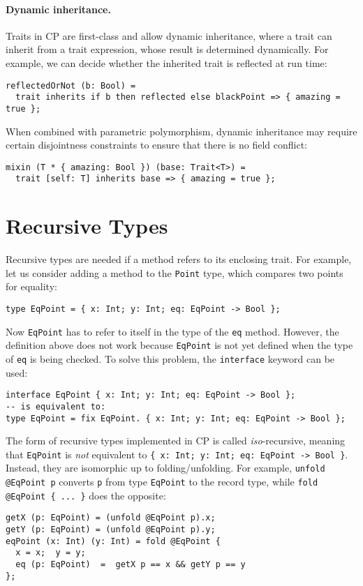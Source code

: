 \paragraph{Dynamic inheritance.}
Traits in CP are first-class and allow dynamic inheritance, where
a trait can inherit from a trait expression, whose result is determined
dynamically. For example, we can decide whether the inherited trait is reflected
at run time:
\begin{lstlisting}
reflectedOrNot (b: Bool) =
  trait inherits if b then reflected else blackPoint => { amazing = true };
\end{lstlisting}
When combined with parametric polymorphism, dynamic inheritance may require
certain disjointness constraints to ensure that there is no field conflict:
\begin{lstlisting}
mixin (T * { amazing: Bool }) (base: Trait<T>) =
  trait [self: T] inherits base => { amazing = true };
\end{lstlisting}

\section{Recursive Types}

Recursive types are needed if a method refers to its enclosing trait. For
example, let us consider adding a method to the \lstinline{Point} type, which
compares two points for equality:
\begin{lstlisting}
type EqPoint = { x: Int; y: Int; eq: EqPoint -> Bool };
\end{lstlisting}
Now \lstinline{EqPoint} has to refer to itself in the type of the \lstinline{eq}
method. However, the definition above does not work because \lstinline{EqPoint} is
not yet defined when the type of \lstinline{eq} is being checked. To solve this
problem, the \lstinline{interface} keyword can be used:
\begin{lstlisting}
interface EqPoint { x: Int; y: Int; eq: EqPoint -> Bool };
-- is equivalent to:
type EqPoint = fix EqPoint. { x: Int; y: Int; eq: EqPoint -> Bool };
\end{lstlisting}
The form of recursive types implemented in CP is called \emph{iso}-recursive,
meaning that \lstinline{EqPoint} is \emph{not} equivalent to
\lstinline|{ x: Int; y: Int; eq: EqPoint -> Bool }|. Instead, they are isomorphic
up to folding/unfolding. For example, \lstinline{unfold @EqPoint p} converts
\lstinline{p} from type \lstinline{EqPoint} to the record type, while
\lstinline|fold @EqPoint { ... }| does the opposite:
\begin{lstlisting}
getX (p: EqPoint) = (unfold @EqPoint p).x;
getY (p: EqPoint) = (unfold @EqPoint p).y;
eqPoint (x: Int) (y: Int) = fold @EqPoint {
  x = x;  y = y;
  eq (p: EqPoint)  =  getX p == x && getY p == y
};
\end{lstlisting}

